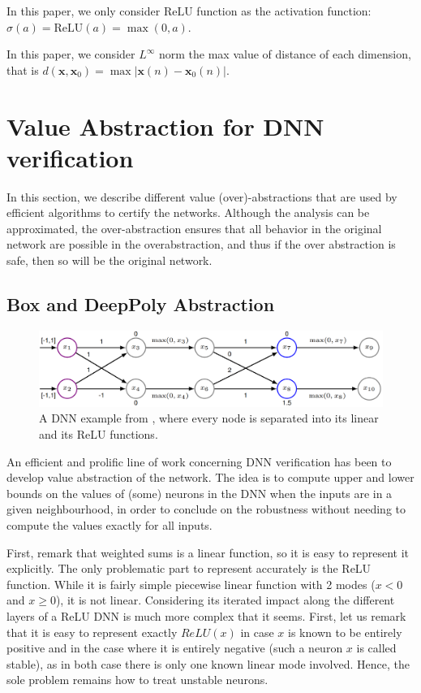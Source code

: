 \documentclass{llncs}
\newcommand{\ReLU}{\mathrm{ReLU}}
\begin{document}
In this paper, we only consider $\ReLU$ function as the activation function: $\sigma(a)=\ReLU(a)=\max(0,a)$. 

In this paper, we consider $L^{\infty}$ norm the max value of distance of each dimension, that is $d(\boldsymbol{x},\boldsymbol{x}_0)=\max |\boldsymbol{x}(n)-\boldsymbol{x}_0(n)|$. 
\fi


\section{Value Abstraction for DNN verification}

In this section, we describe different value (over)-abstractions that are used by efficient algorithms to certify the networks. Although the analysis can be approximated, the over-abstraction ensures that all behavior in the original network are possible in the overabstraction, and thus if the over abstraction is safe, then so will be the original network.

\subsection{Box and DeepPoly Abstraction}

\begin{figure}[t!]
	\centering
		\includegraphics[scale=0.4]{example.png}
	\caption{A DNN example from \cite{kneuron}, where every node is separated into its linear and its ReLU functions.}
	\label{fig1}
	\end{figure}
	
An efficient and prolific line of work concerning DNN verification has been to develop value abstraction of the network. The idea is to compute upper and lower bounds on the values of (some) neurons in the DNN when the inputs are in a given neighbourhood, in order to conclude on the robustness without needing to compute the values exactly for all inputs.

First, remark that weighted sums is a linear function, so it is easy to represent it explicitly. The only problematic part to represent accurately is the ReLU function. While it is fairly simple piecewise linear function with 2 modes ($x<0$ and $x \geq 0$), it is not linear. Considering its iterated impact along the different layers of a ReLU DNN is much more complex that it seems. First, let us remark that it is easy to represent exactly $ReLU(x)$
in case $x$ is known to be entirely positive and in the case where it is entirely negative
(such a neuron $x$ is called stable), as in both case there is only one known linear mode involved. Hence, the sole problem remains how to treat unstable neurons.
\end{document}
